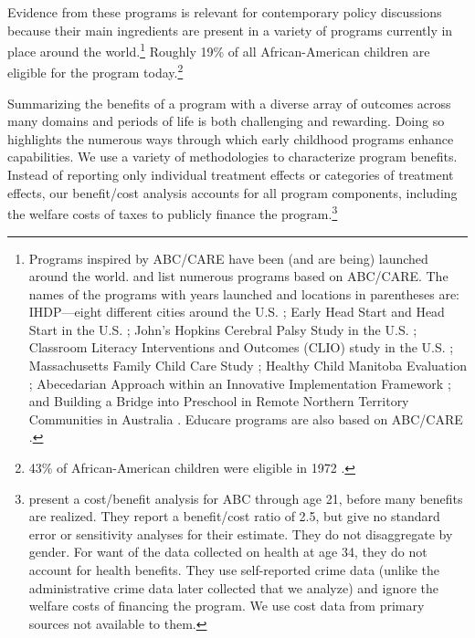 Evidence from these programs is relevant for contemporary policy discussions because their main ingredients are present in a variety of programs currently in place around the world.\footnote{Programs inspired by ABC/CARE have been (and are being) launched around the world. \citet{Sparling_2010_Highlights} and \citet{Ramey_Ramey_Lanzi_2014_Interventions} list numerous programs based on ABC/CARE. The names of the programs with years launched and locations in parentheses are: IHDP---eight different cities around the U.S. \citep{Spiker-etal_1997_Helping}; Early Head Start and Head Start in the U.S. \citep{Schneider_McDonald-eds_2007_Scale-Up_Vol-1}; John's Hopkins Cerebral Palsy Study in the U.S. \citep{Sparling_2010_Highlights}; Classroom Literacy Interventions and Outcomes (CLIO) study in the U.S. \citep{Sparling_2010_Highlights}; Massachusetts Family Child Care Study \citep{Collins_etal_2010_Massachusetts-Study}; Healthy Child Manitoba Evaluation \citep{Healthy_Child_Manitoba_2015_Starting-Early}; Abecedarian Approach within an Innovative Implementation Framework \citep{Jensen_Nielsen_2016_ABC-Programme-Pilot}; and Building a Bridge into Preschool in Remote Northern Territory Communities in Australia \citep{UMonash_Dataset_2015_URL}. Educare programs are also based on ABC/CARE \citep{Educare_2014_Research_Agenda,Yazejian_Bryant_2012_Educare}.} Roughly 19\% of all African-American children are eligible for the program today.\footnote{43\% of African-American children were eligible in 1972 \citep{Garcia_2016_National-Implementation-ECI}.}

Summarizing the benefits of a program with a diverse array of outcomes across many domains and periods of life is both challenging and rewarding. Doing so highlights the numerous ways through which early childhood programs enhance capabilities. We use a variety of methodologies to characterize program benefits. Instead of reporting only individual treatment effects or categories of treatment effects, our benefit/cost analysis accounts for all program components, including the welfare costs of taxes to publicly finance the program.\footnote{\cite{Barnett_Masse_2002_benefitcost,Barnett_Masse_2007_EER} present a cost/benefit analysis for ABC through age 21, before many benefits are realized. They report a benefit/cost ratio of 2.5, but give no standard error or sensitivity analyses for their estimate. They do not disaggregate by gender. For want of the data collected on health at age 34, they do not account for health benefits. They use self-reported crime data (unlike the administrative crime data later collected that we analyze) and ignore the welfare costs of financing the program. We use cost data from primary sources not available to them.}


